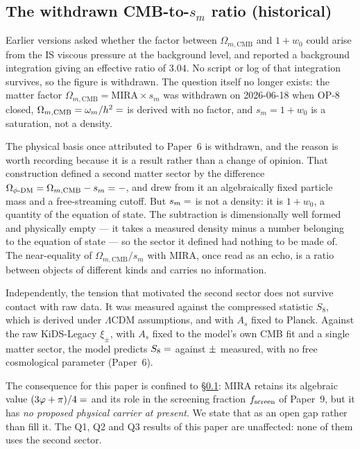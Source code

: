 \documentclass[12pt,a4paper]{article}
\newcommand{\wz}{w_0}
\begin{document}
\subsection{The withdrawn CMB-to-$s_m$ ratio (historical)}
\label{subsec:MIRA_background}

Earlier versions asked whether the factor between $\Omega_{m,\mathrm{CMB}}$ and
$1+\wz$ could arise from the IS viscous pressure at the background level, and
reported a background integration giving an effective ratio of $3.04$. No script
or log of that integration survives, so the figure is withdrawn. The question
itself no longer exists: the matter factor $\Omega_{m,\mathrm{CMB}} =
\mathrm{MIRA}\times s_m$ was withdrawn on 2026-06-18 when OP-8 closed,
$\Omega_{m,\mathrm{CMB}}=\omega_m/h^{2}=\val{OMEGA_M_TOTAL_d6}$ is derived with no factor,
and $s_m=1+w_0$ is a saturation, not a density.

The physical basis once attributed to Paper~6 is withdrawn, and the reason is
worth recording because it is a result rather than a change of opinion.
That construction defined a second matter sector by the difference
$\Omega_{\phi\text{-DM}} = \Omega_{m,\mathrm{CMB}} - s_m
= \val{OMEGA_M_TOTAL_d6} - \val{S_M_d6}$, and drew from it an algebraically fixed particle mass and
a free-streaming cutoff.  But $s_m = \val{S_M_d6}$ is not a
density: it is $1+w_0$, a quantity of the equation of state.  The subtraction
is dimensionally well formed and physically empty --- it takes a measured
density minus a number belonging to the equation of state --- so the sector it
defined had nothing to be made of.  The near-equality of
$\Omega_{m,\mathrm{CMB}}/s_m$ with $\mathrm{MIRA}$, once read as
an echo, is a ratio between objects of different kinds and carries no information.

Independently, the tension that motivated the second sector does not survive
contact with raw data.  It was measured against the compressed statistic $S_8$,
which is derived under $\Lambda$CDM assumptions, and with $A_s$ fixed to
Planck.  Against the raw KiDS-Legacy $\xi_\pm$, with $A_s$ fixed to the model's
own CMB fit and a single matter sector, the model predicts
$S_8 = \val{S8_leg_pred}$ against $\val{S8_legacy_dato}\pm\val{S8_legacy_dato_sigma}$ measured, with no free cosmological
parameter (Paper~6).

The consequence for this paper is confined to \S\ref{subsec:MIRA_background}:
$\mathrm{MIRA}$ retains its algebraic value $(3\varphi+\pi)/4 = \val{MIRA_d6}$ and
its role in the screening fraction $f_{\rm screen}$ of Paper~9, but it has
\emph{no proposed physical carrier at present}.  We state that as an open gap
rather than fill it.  The Q1, Q2 and Q3 results of this paper are unaffected:
none of them uses the second sector.
\end{document}
